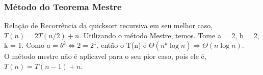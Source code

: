 \subsubsection{Método do Teorema Mestre}
Relação de Recorrência da quicksort recursiva em seu melhor caso, $T(n) = 2T(n/2) + n$. Utilizando o método Mestre, temos.
Tome a = 2, b = 2, k = 1. Como $a = b^k \Leftrightarrow 2 = 2^1$, então o T(n) é $\Theta(n^k \log{n}) \Rightarrow \Theta(n \log{n})$. \\
O método mestre não é aplicavel para o seu pior caso, pois ele é, $T(n) = T(n-1) + n$.
